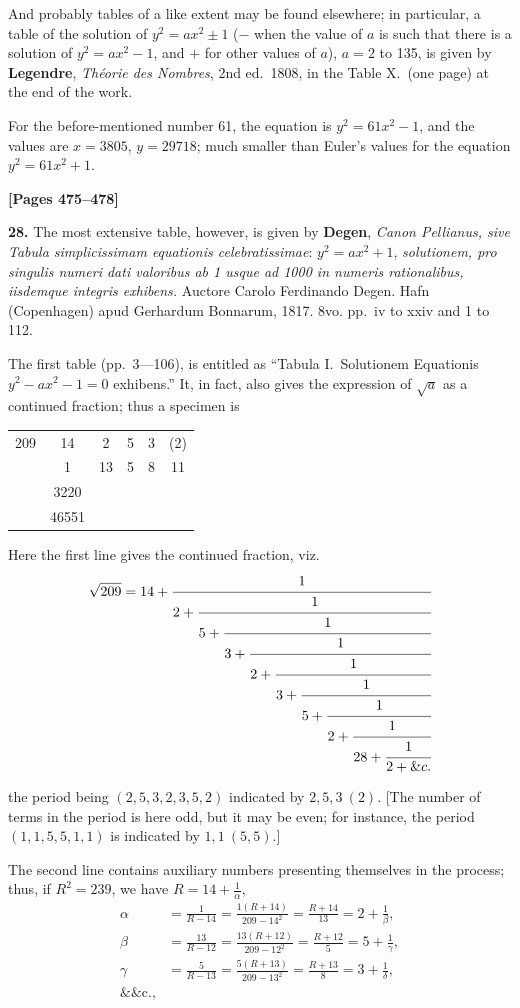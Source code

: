 \documentclass[11pt,a4paper]{book}
\begin{document}
And probably tables of a like extent may be found elsewhere; in particular, a table of the solution
of $y^{2} = ax^{2} \pm 1$ ($-$ when the value of $a$ is such that there is a solution of $y^{2} = ax^{2} - 1$,
and $+$ for other values of $a$), $a = 2$ to 135, is given by
\quad\textbf{Legendre}, \textit{Th\' eorie des Nombres}, 2nd ed.\ 1808, in the Table X.\ (one page) at the end of the work.

For the before-mentioned number 61, the equation is $y^{2} = 61x^{2} - 1$,
and the values are $x = 3805$, $y = 29718$; much smaller than Euler's values for the equation $y^{2} = 61x^{2} + 1$.


\newpage
\textbf{[Pages 475--478]}

\textbf{28.} The most extensive table, however, is given by
\quad\textbf{Degen}, \textit{Canon Pellianus, sive Tabula simplicissimam equationis celebratissimae}:
$y^{2} = ax^{2} + 1$, \textit{solutionem, pro singulis numeri dati valoribus ab 1 usque ad 1000 in numeris rationalibus, iisdemque integris exhibens.}
Auctore Carolo Ferdinando Degen. Hafn (Copenhagen) apud Gerhardum Bonnarum, 1817. 8vo. pp.\ iv to xxiv and 1 to 112.

The first table (pp.\ 3---106), is entitled as ``Tabula I.\ Solutionem Equationis $y^{2} - ax^{2} - 1 = 0$ exhibens.''
It, in fact, also gives the expression of $\sqrt{a}$ as a continued fraction; thus a specimen is
\begin{center}\begin{tabular}{c|ccccc}209 & 14 & 2 & 5 & 3 & (2) \\
 & 1 & 13 & 5 & 8 & 11 \\
 & 3220 & & & & \\
 & 46551 & & & & \\
\end{tabular}\end{center}

Here the first line gives the continued fraction, viz.
\[\sqrt{209} = 14 + \cfrac{1}{2 + \cfrac{1}{5 + \cfrac{1}{3 + \cfrac{1}{2 + \cfrac{1}{3 + \cfrac{1}{5 + \cfrac{1}{2 + \cfrac{1}{28 + \cfrac{1}{2 + \&c.}}}}}}}}}\]

the period being $(2, 5, 3, 2, 3, 5, 2)$ indicated by $2, 5, 3\ (2)$. [The number of terms in the period
is here odd, but it may be even; for instance, the period $(1, 1, 5, 5, 1, 1)$ is indicated by $1, 1\ (5, 5)$.]

The second line contains auxiliary numbers presenting themselves in the process;
thus, if $R^{2} = 239$, we have $R = 14 + \frac{1}{\alpha}$,
\begin{align*}
\alpha &= \frac{1}{R-14} = \frac{1(R+14)}{209-14^{2}} = \frac{R+14}{13} = 2 + \frac{1}{\beta}, \\
\beta &= \frac{13}{R-12} = \frac{13(R+12)}{209-12^{2}} = \frac{R+12}{5} = 5 + \frac{1}{\gamma}, \\
\gamma &= \frac{5}{R-13} = \frac{5(R+13)}{209-13^{2}} = \frac{R+13}{8} = 3 + \frac{1}{\delta}, \\
\&\text{\&c.,}
\end{align*}
\end{document}
